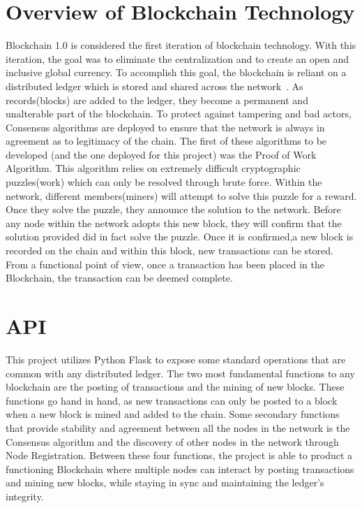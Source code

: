 \section{Overview of Blockchain Technology}

Blockchain 1.0 is considered the first iteration of blockchain
technology.  With this iteration, the goal was to eliminate the
centralization and to create an open and inclusive global currency. To
accomplish this goal, the blockchain is reliant on a distributed
ledger which is stored and shared across the
network~\cite{hid-sp18-414-www-promise-bitcoin-blockchain}.  As
records(blocks) are added to the ledger, they become a permanent and
unalterable part of the blockchain. To protect against tampering and
bad actors, Consensus algorithms are deployed to ensure that the
network is always in agreement as to legitimacy of the chain. The
first of these algorithms to be developed (and the one deployed for
this project) was the Proof of Work Algorithm. This algorithm relies
on extremely difficult cryptographic puzzles(work) which can only be
resolved through brute force. Within the network, different
members(miners) will attempt to solve this puzzle for a reward. Once
they solve the puzzle, they announce the solution to the
network. Before any node within the network adopts this new block,
they will confirm that the solution provided did in fact solve the
puzzle. Once it is confirmed,a new block is recorded on the chain and
within this block, new transactions can be stored. From a functional
point of view, once a transaction has been placed in the Blockchain,
the transaction can be deemed
complete.~\cite{hid-sp18-414-financialinnovation-zhao}

\section{API}

This project utilizes Python Flask to expose some standard operations
that are common with any distributed ledger. The two most fundamental
functions to any blockchain are the posting of transactions and the
mining of new blocks. These functions go hand in hand, as new
transactions can only be posted to a block when a new block is mined
and added to the chain. Some secondary functions that provide
stability and agreement between all the nodes in the network is the
Consensus algorithm and the discovery of other nodes in the network
through Node Registration. Between these four functions, the project
is able to product a functioning Blockchain where multiple nodes can
interact by posting transactions and mining new blocks, while staying
in sync and maintaining the ledger's integrity.

